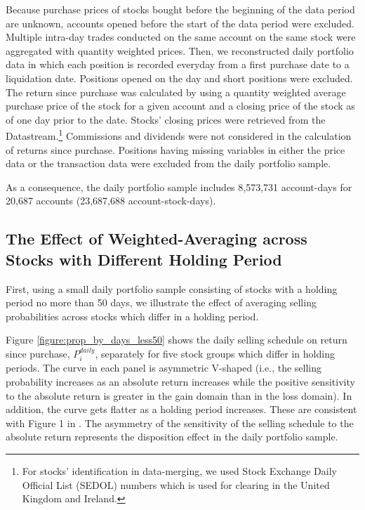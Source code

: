 \documentclass[11pt, a4paper]{article}
\begin{document}
Because purchase prices of stocks bought before the beginning of the data period are unknown, accounts opened before the start of the data period were excluded. Multiple intra-day trades conducted on the same account on the same stock were aggregated with quantity weighted prices. Then, we reconstructed daily portfolio data in which each position is recorded everyday from a first purchase date to a liquidation date. Positions opened on the day and short positions were excluded.
The return since purchase was calculated by using a quantity weighted average purchase price of the stock for a given account and a closing price of the stock as of one day prior to the date. Stocks' closing prices were retrieved from the Datastream.\footnote{For stocks' identification in data-merging, we used Stock Exchange Daily Official List (SEDOL) numbers which is used for clearing in the United Kingdom and Ireland.} Commissions and dividends were not considered in the calculation of returns since purchase. Positions having missing variables in either the price data or the transaction data were excluded from the daily portfolio sample.
	
As a consequence, the daily portfolio sample includes 8,573,731 account-days for 20,687 accounts (23,687,688 account-stock-days).


\subsection{The Effect of Weighted-Averaging across Stocks with Different Holding Period}
\label{section:ave}
First, using a small daily portfolio sample consisting of stocks with a holding period no more than 50 days, we illustrate the effect of averaging selling probabilities across stocks which differ in a holding period.

Figure \ref{figure:prop_by_days_less50} shows the daily selling schedule on return since purchase, $P^{daily}_{i}$, separately for five stock groups which differ in holding periods. The curve in each panel is asymmetric V-shaped (i.e., the selling probability increases as an absolute return increases while the positive sensitivity to the absolute return is greater in the gain domain than in the loss domain). In addition, the curve gets flatter as a holding period increases. These are consistent with Figure 1 in \citet{BenDavidHirshleifer12}. The asymmetry of the sensitivity of the selling schedule to the absolute return represents the disposition effect in the daily portfolio sample.
\end{document}
